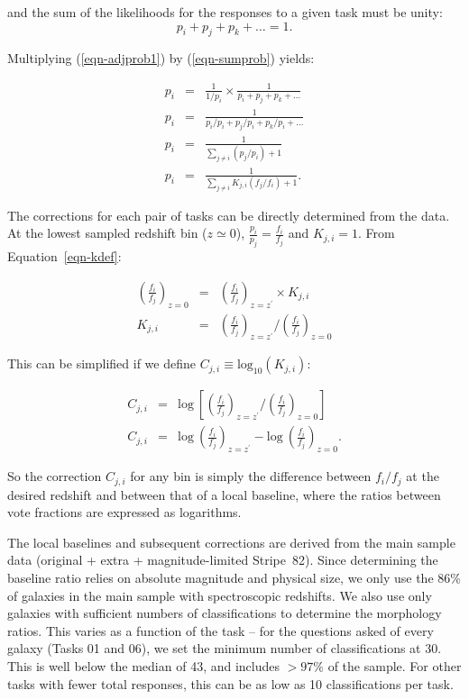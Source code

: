 \documentclass[useAMS,usenatbib]{mn2e}
\begin{document}
\noindent and the sum of the likelihoods for the responses to a given task must be unity:
\begin{equation}
p_i + p_j + p_k + \dots = 1.
\label{eqn-sumprob}
\end{equation}

\noindent Multiplying (\ref{eqn-adjprob1}) by (\ref{eqn-sumprob}) yields:

\begin{eqnarray}
p_i &=& \frac{1}{1/p_i} \times \frac{1}{p_i + p_j + p_k + \dots} \\
p_i &=& \frac{1}{p_i/p_i + p_j/p_i + p_k/p_i + \dots} \\
p_i &=& \frac{1}{\sum\limits_{j\ne i}{(p_j/p_i)} + 1} \\
p_i &=& \frac{1}{\sum\limits_{j\ne i}{K_{j,i} (f_j/f_i)} + 1}.
\end{eqnarray}

The corrections for each pair of tasks can be directly determined from the data. At the lowest sampled redshift bin ($z\simeq0$), $\frac{p_i}{p_j} = \frac{f_i}{f_j}$ and $K_{j,i}=1$. From Equation~\ref{eqn-kdef}:

\begin{eqnarray}
\left(\frac{f_i}{f_j}\right)_{z=0} &=& \left(\frac{f_i}{f_j}\right)_{z=z^\prime}\times K_{j,i} \\
K_{j,i} &=& \left(\frac{f_i}{f_j}\right)_{z=z^\prime} / \left(\frac{f_i}{f_j}\right)_{z=0}
\end{eqnarray}

\noindent This can be simplified if we define $C_{j,i}\equiv\text{log}_{10}(K_{j,i})$:

\begin{eqnarray}
C_{j,i} &=& \text{log}~\left[\left(\frac{f_i}{f_j}\right)_{z=z^\prime} / \left(\frac{f_i}{f_j}\right)_{z=0}\right] \\
C_{j,i} &=& \text{log}~\left(\frac{f_i}{f_j}\right)_{z=z^\prime} - \text{log}~\left(\frac{f_i}{f_j}\right)_{z=0}.
\end{eqnarray}

\noindent So the correction $C_{j,i}$ for any bin is simply the difference between $f_i/f_j$ at the desired redshift and between that of a local baseline, where the ratios between vote fractions are expressed as logarithms.  

The local baselines and subsequent corrections are derived from the main sample data (original + extra + magnitude-limited Stripe~82). Since determining the baseline ratio relies on absolute magnitude and physical size, we only use the 86\% of galaxies in the main sample with spectroscopic redshifts. We also use only galaxies with sufficient numbers of classifications to determine the morphology ratios. This varies as a function of the task -- for the questions asked of every galaxy (Tasks 01 and 06), we set the minimum number of classifications at 30. This is well below the median of 43, and includes $>97\%$ of the sample. For other tasks with fewer total responses, this can be as low as 10 classifications per task. 
\end{document}
